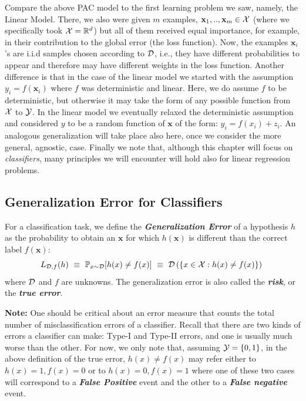 {Compare the above PAC model to the first learning problem we saw, namely, the Linear Model. There, we also were given $m$ examples, $\mathbf{x}_1,..,\mathbf{x}_m\in\mathcal{X}$ (where we specifically took  $\mathcal{X}=\mathbb{R}^d$) but all of them received equal importance, for example, in their contribution to the global error (the loss function). Now, the examples $\mathbf{x}_i$'s are  i.i.d samples chosen according to $\mathcal{D}$, i.e., they have different probabilities to appear and therefore may have different weights in the loss function. Another difference is that in the case of the linear model we started with the assumption $y_i=f(\mathbf{x}_i)$ where $f$ was deterministic and linear. Here, we do assume $f$ to be deterministic, but otherwise it may take the form of any possible function from $\mathcal{X}$ to $\mathcal{Y}$.
In the linear model we eventually relaxed the deterministic assumption and considered $y$ to be a random function of $\mathbf{x}$ of the form:  $y_i = f(x_i)+z_i$. 
An analogous generalization will take place also here, once we consider the more general, agnostic, case. Finally we note that, although this chapter will focus on \textit{classifiers}, many principles we will encounter will hold also for linear regression problems.

\subsection{Generalization Error for Classifiers}

For a classification task, we define the \textit{\textbf{Generalization Error}} of a hypothesis $h$ as the probability to obtain an $\mathbf{x}$ for which $h(\mathbf{x})$ is different than the correct label $f(\mathbf{x})$:
\[
L_{\mathcal{D},f}(h) ~\equiv~ \mathbb{P}_{x \sim \mathcal{D}}[h(x) \neq f(x)] ~\equiv ~ \mathcal{D}\left( \{ x \in \mathcal{X} : h(x)
\neq f(x) \}\right) ~
\]
where $\mathcal{D}$ and $f$ are unknowns. The generalization error is also called the \textit{\textbf{risk}}, or the \textit{\textbf{true error}}. 

{\bf Note:} One should be critical about an error measure that counts the total number of misclassification errors of a classifier. Recall that  there are two kinds of errors a classifier can make: Type-I and Type-II errors, and one is usually much worse than the other. For now, we only note that, assuming $\mathcal{Y} =\{0,1\}$, in the above definition of the true error, $h(x) \neq f(x)$ may refer either to  $h(x)=1, f(x)=0$ or to $h(x)=0, f(x)=1$ where one of these two cases  will correspond to a \textit{\textbf{False Positive}} event and the other to a \textit{\textbf{False negative}} event.
	


}
